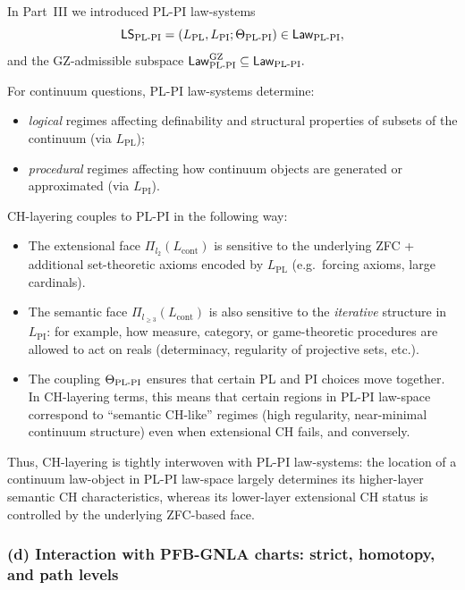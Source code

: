\documentclass[11pt]{book}
\theoremstyle{plain}
\theoremstyle{definition}
\begin{document}
In Part~III we introduced PL-PI law-systems
\[
  \mathsf{LS}_{\mathrm{PL\text- PI}}
  =
  (L_{\mathrm{PL}},L_{\mathrm{PI}};\Theta_{\mathrm{PL\text- PI}})
  \in\mathsf{Law}_{\mathrm{PL\text- PI}},
\]
and the GZ-admissible subspace
\(
  \mathsf{Law}_{\mathrm{PL\text- PI}}^{\mathrm{GZ}}
\subseteq \mathsf{Law}_{\mathrm{PL\text- PI}}.
\)

For continuum questions, PL-PI law-systems determine:

\begin{itemize}
  \item \emph{logical} regimes affecting definability and structural
        properties of subsets of the continuum (via $L_{\mathrm{PL}}$);
  \item \emph{procedural} regimes affecting how continuum objects are
        generated or approximated (via $L_{\mathrm{PI}}$).
\end{itemize}

CH-layering couples to PL-PI in the following way:

\begin{itemize}
  \item The extensional face $\Pi_{l_2}(L_{\mathrm{cont}})$ is sensitive
        to the underlying ZFC + additional set-theoretic axioms
        encoded by $L_{\mathrm{PL}}$ (e.g.\ forcing axioms, large
        cardinals).
  \item The semantic face $\Pi_{l_{\ge3}}(L_{\mathrm{cont}})$ is also
        sensitive to the \emph{iterative} structure in $L_{\mathrm{PI}}$:
        for example, how measure, category, or game-theoretic
        procedures are allowed to act on reals (determinacy, regularity
        of projective sets, etc.).
  \item The coupling $\Theta_{\mathrm{PL\text- PI}}$ ensures that
        certain PL and PI choices move together. In CH-layering terms,
        this means that certain regions in PL-PI law-space correspond
        to “semantic CH-like” regimes (high regularity, near-minimal
        continuum structure) even when extensional CH fails, and
        conversely.
\end{itemize}

Thus, CH-layering is tightly interwoven with PL-PI law-systems: the
location of a continuum law-object in PL-PI law-space largely
determines its higher-layer semantic CH characteristics, whereas its
lower-layer extensional CH status is controlled by the underlying
ZFC-based face.



\subsubsection*{(d) Interaction with PFB-GNLA charts: strict, homotopy, and path levels}
\end{document}
